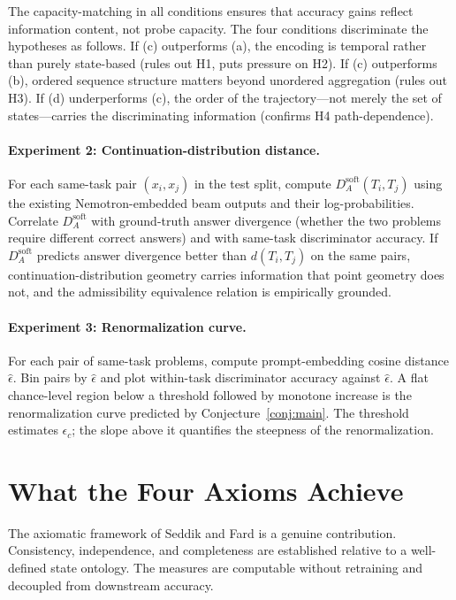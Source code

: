 \documentclass[11pt]{article}
\begin{document}
The capacity-matching in all conditions ensures that accuracy gains reflect information content,
not probe capacity. The four conditions discriminate the hypotheses as follows. If (c)
outperforms (a), the encoding is temporal rather than purely state-based (rules out H1, puts
pressure on H2). If (c) outperforms (b), ordered sequence structure matters beyond unordered
aggregation (rules out H3). If (d) underperforms (c), the order of the trajectory---not merely
the set of states---carries the discriminating information (confirms H4 path-dependence).

\paragraph{Experiment 2: Continuation-distribution distance.}
For each same-task pair $(x_i, x_j)$ in the test split, compute $D_A^{\mathrm{soft}}(T_i,
T_j)$ using the existing Nemotron-embedded beam outputs and their log-probabilities. Correlate
$D_A^{\mathrm{soft}}$ with ground-truth answer divergence (whether the two problems require
different correct answers) and with same-task discriminator accuracy. If $D_A^{\mathrm{soft}}$
predicts answer divergence better than $d(T_i, T_j)$ on the same pairs, continuation-distribution
geometry carries information that point geometry does not, and the admissibility equivalence
relation is empirically grounded.

\paragraph{Experiment 3: Renormalization curve.}
For each pair of same-task problems, compute prompt-embedding cosine distance $\hat\epsilon$.
Bin pairs by $\hat\epsilon$ and plot within-task discriminator accuracy against $\hat\epsilon$.
A flat chance-level region below a threshold followed by monotone increase is the renormalization
curve predicted by Conjecture~\ref{conj:main}. The threshold estimates $\epsilon_c$; the slope
above it quantifies the steepness of the renormalization.

\section{What the Four Axioms Achieve}

The axiomatic framework of Seddik and Fard is a genuine contribution. Consistency, independence,
and completeness are established relative to a well-defined state ontology. The measures are
computable without retraining and decoupled from downstream accuracy.
\end{document}
